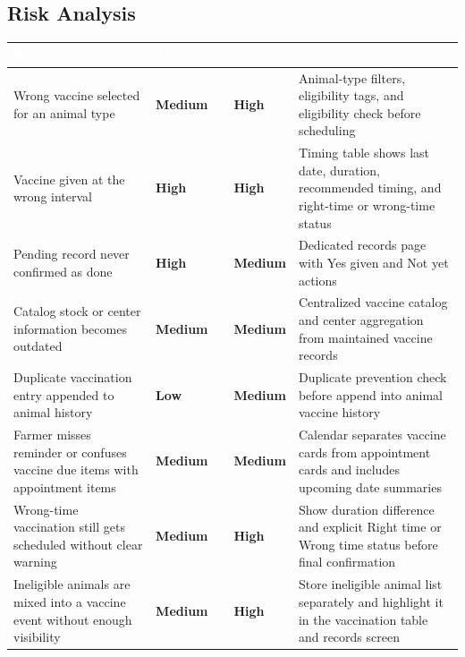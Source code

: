 \documentclass[12pt]{article}
\begin{document}
\subsection{Risk Analysis}

\begin{longtable}{|p{3.8cm}|p{2.5cm}|p{2.5cm}|p{4cm}|}
\hline
\rowcolor{headerblue}\textcolor{white}{\textbf{Risk}} & \textcolor{white}{\textbf{Likelihood}} & \textcolor{white}{\textbf{Impact}} & \textcolor{white}{\textbf{Mitigation}} \\
\hline
Wrong vaccine selected for an animal type & \textcolor{medrisk}{\textbf{Medium}} & \textcolor{highrisk}{\textbf{High}} & Animal-type filters, eligibility tags, and eligibility check before scheduling \\
\hline
\rowcolor{rowgray}
Vaccine given at the wrong interval & \textcolor{highrisk}{\textbf{High}} & \textcolor{highrisk}{\textbf{High}} & Timing table shows last date, duration, recommended timing, and right-time or wrong-time status \\
\hline
Pending record never confirmed as done & \textcolor{highrisk}{\textbf{High}} & \textcolor{medrisk}{\textbf{Medium}} & Dedicated records page with Yes given and Not yet actions \\
\hline
\rowcolor{rowgray}
Catalog stock or center information becomes outdated & \textcolor{medrisk}{\textbf{Medium}} & \textcolor{medrisk}{\textbf{Medium}} & Centralized vaccine catalog and center aggregation from maintained vaccine records \\
\hline
Duplicate vaccination entry appended to animal history & \textcolor{lowrisk}{\textbf{Low}} & \textcolor{medrisk}{\textbf{Medium}} & Duplicate prevention check before append into animal vaccine history \\
\hline
\rowcolor{rowgray}
Farmer misses reminder or confuses vaccine due items with appointment items & \textcolor{medrisk}{\textbf{Medium}} & \textcolor{medrisk}{\textbf{Medium}} & Calendar separates vaccine cards from appointment cards and includes upcoming date summaries \\
\hline
Wrong-time vaccination still gets scheduled without clear warning & \textcolor{medrisk}{\textbf{Medium}} & \textcolor{highrisk}{\textbf{High}} & Show duration difference and explicit Right time or Wrong time status before final confirmation \\
\hline
\rowcolor{rowgray}
Ineligible animals are mixed into a vaccine event without enough visibility & \textcolor{medrisk}{\textbf{Medium}} & \textcolor{highrisk}{\textbf{High}} & Store ineligible animal list separately and highlight it in the vaccination table and records screen \\
\hline
\end{longtable}
\end{document}
